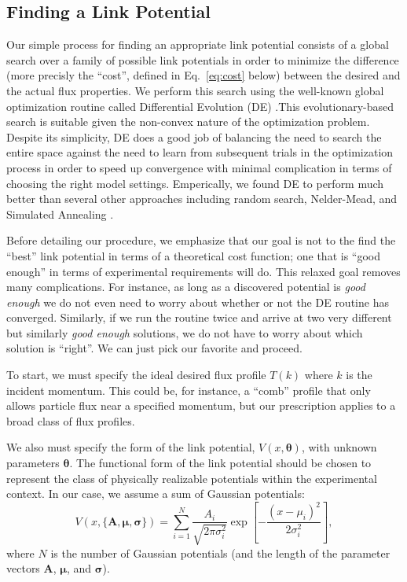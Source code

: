 \documentclass[onecolumn,amsmath,amssymb,nofootinbib,prl]{revtex4-1}
\begin{document}
\subsection{Finding a Link Potential}
Our simple process for finding an appropriate link potential consists of a global search over a family of possible link potentials in order to minimize the difference (more precisly the ``cost'', defined in Eq.~\eqref{eq:cost} below) between the desired and the actual flux properties. We perform this search using the well-known global optimization routine called Differential Evolution (DE) \cite{original DE paper}.This evolutionary-based search is suitable given the non-convex nature of the optimization problem. Despite its simplicity, DE does a good job of balancing the need to search the entire space against the need to learn from subsequent trials in the optimization process in order to speed up convergence with minimal complication in terms of choosing the right model settings. Emperically, we found DE to perform much better than several other approaches including random search, Nelder-Mead, and Simulated Annealing \cite{Tests performed using mathematica}.

Before detailing our procedure, we emphasize that our goal is not to the find the ``best'' link potential in terms of a theoretical cost function; one that is ``good enough'' in terms of experimental requirements will do. This relaxed goal removes many complications. For instance, as long as a discovered potential is {\it good enough} we do not even need to worry about whether or not the DE routine has converged. Similarly, if we run the routine twice and arrive at two very different but similarly {\it good enough} solutions, we do not have to worry about which solution is ``right''. We can just pick our favorite and proceed.

To start, we must specify the ideal desired flux profile $T(k)$ where $k$ is the incident momentum. This could be, for instance, a ``comb'' profile that only allows particle flux near a specified momentum, but our prescription applies to a broad class of flux profiles.

We also must specify the form of the link potential, $V(x, \bm{\theta})$, with unknown parameters $\bm{\theta}$. The functional form of the link potential should be chosen to represent the class of physically realizable potentials within the experimental context. In our case, we assume a sum of Gaussian potentials:
\begin{equation}
V(x,\{\bm{A},\bm{\mu},\bm{\sigma} \}) = \sum_{i=1}^{N}\frac{A_i}{\sqrt{2\pi\sigma_i^2}}\exp\left[{-\frac{(x-\mu_i)^2}{2\sigma_i^2}}\right],
\end{equation}
where $N$ is the number of Gaussian potentials (and the length of the parameter vectors $\bm{A}$, $\bm{\mu}$, and $\bm{\sigma}$).
\end{document}
